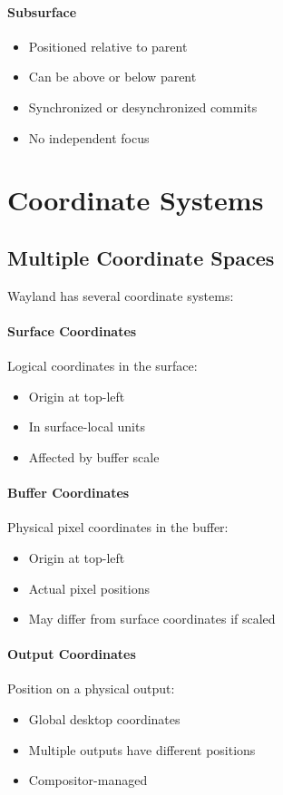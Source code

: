 \paragraph{Subsurface}
\begin{itemize}
    \item Positioned relative to parent
    \item Can be above or below parent
    \item Synchronized or desynchronized commits
    \item No independent focus
\end{itemize}

\section{Coordinate Systems}

\subsection{Multiple Coordinate Spaces}

Wayland has several coordinate systems:

\paragraph{Surface Coordinates}
Logical coordinates in the surface:
\begin{itemize}
    \item Origin at top-left
    \item In surface-local units
    \item Affected by buffer scale
\end{itemize}

\paragraph{Buffer Coordinates}
Physical pixel coordinates in the buffer:
\begin{itemize}
    \item Origin at top-left
    \item Actual pixel positions
    \item May differ from surface coordinates if scaled
\end{itemize}

\paragraph{Output Coordinates}
Position on a physical output:
\begin{itemize}
    \item Global desktop coordinates
    \item Multiple outputs have different positions
    \item Compositor-managed
\end{itemize}

